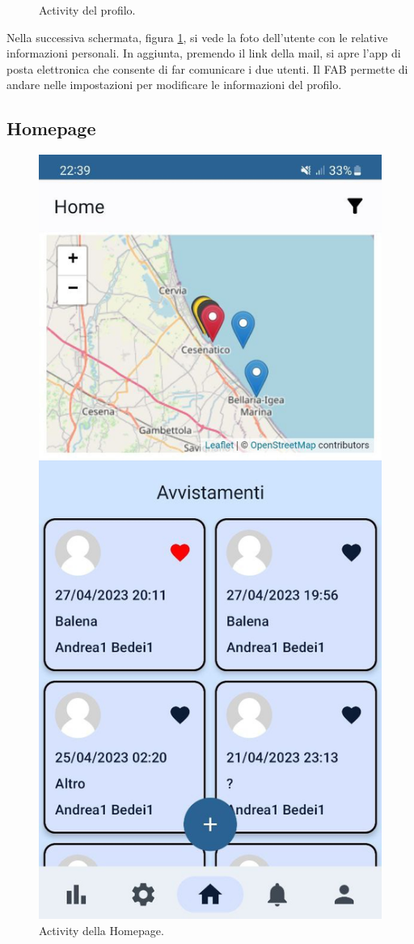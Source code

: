 \documentclass[a4paper,final,12pt]{report}
\begin{document}
\begin{figure}[hbtp]
\caption{Activity del profilo.}
\label{figura:actprof}
\end{figure}
Nella successiva schermata, figura \ref{figura:actprof}, si vede la foto dell'utente con le relative informazioni personali. In aggiunta, premendo il link della mail, si apre l'app di posta elettronica che consente di far comunicare i due utenti. Il FAB permette di andare nelle impostazioni per modificare le informazioni del profilo.

\newpage

\subsection{Homepage}
\begin{figure}[hbtp]
\centering
\includegraphics[scale=0.19]{img_concettuale/hommob.jpg}
\caption{Activity della Homepage.}
\label{figura:acthomepage}
\end{figure}
\end{document}
